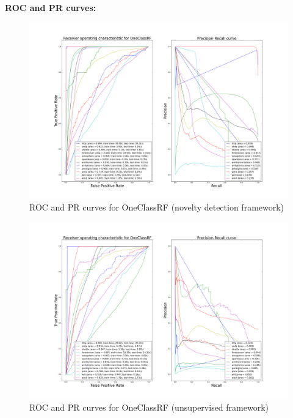 \clearpage
\textbf{ROC and PR curves:}
\begin{figure}[!ht]
  \caption{ROC and PR curves for OneClassRF (novelty detection framework)}
  \label{ocrf:fig:oneclassrf_roc_pr}
  \centering
  \includegraphics[trim=175 80 175 123, clip, width=0.992\linewidth]{fig_source/ocrf_fig/bench_oneclassrf_roc_pr_supervised_factorized.png}
\end{figure}
\begin{figure}[!ht]
  \caption{ROC and PR curves for OneClassRF (unsupervised framework)}
  \label{ocrf:fig:oneclassrf_roc_pr_unsupervised}
  \centering
  \includegraphics[trim=175 80 175 123, clip, width=0.992\linewidth]{fig_source/ocrf_fig/bench_oneclassrf_roc_pr_unsupervised_factorized.png}
\end{figure}

